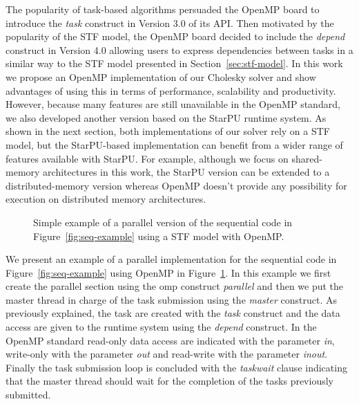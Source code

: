 \documentclass{article}
\newcommand{\openmp}{OpenMP\xspace}
\begin{document}
The popularity of task-based algorithms persuaded the OpenMP board to
introduce the \textit{task} construct in Version 3.0 of its API. Then
motivated by the popularity of the STF model, the OpenMP board decided
to include the \textit{depend} construct in Version 4.0 allowing users
to express dependencies between tasks in a similar way to the STF
model presented in Section~\ref{sec:stf-model}. In this work we
propose an OpenMP implementation of our Cholesky solver and show
advantages of using this in terms of performance, scalability and
productivity. However, because many features are still unavailable in
the OpenMP standard, we also developed another version based on the
StarPU runtime system. As shown in the next section, both
implementations of our solver rely on a STF model, but the
StarPU-based implementation can benefit from a wider range of features
available with StarPU. For example, although we focus on shared-memory
architectures in this work, the StarPU version can be extended to a
distributed-memory version whereas OpenMP doesn't provide any
possibility for execution on distributed memory architectures.

\begin{figure}[!h]
  \centering 
  \caption{\label{fig:stf-openmp-example}Simple example of a parallel version
    of the sequential code in Figure~\ref{fig:seq-example} using a STF
    model with \openmp.}
\end{figure}

We present an example of a parallel implementation for the sequential
code in Figure~\ref{fig:seq-example} using OpenMP in
Figure~\ref{fig:stf-openmp-example}. In this example we first create
the parallel section using the omp construct \textit{parallel} and
then we put the master thread in charge of the task submission using
the \textit{master} construct. As previously explained, the task are
created with the \textit{task} construct and the data access are given
to the runtime system using the \textit{depend} construct. In the
\openmp standard read-only data access are indicated with the
parameter \textit{in}, write-only with the parameter \textit{out} and
read-write with the parameter \textit{inout}. Finally the task
submission loop is concluded with the \textit{taskwait} clause
indicating that the master thread should wait for the completion of
the tasks previously submitted.
\end{document}
